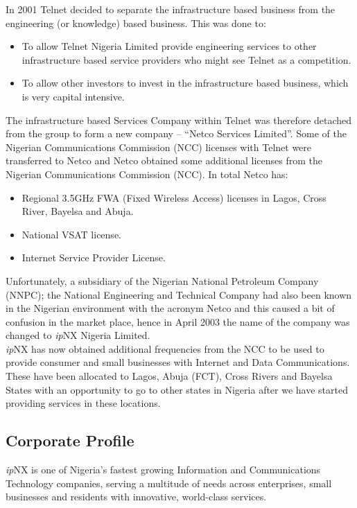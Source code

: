 In 2001 Telnet decided to separate the infrastructure based business from the engineering
(or knowledge) based business. This was done to:
\begin{itemize}
	\item To allow Telnet Nigeria Limited provide engineering services to other infrastructure
	based service providers who might see Telnet as a competition.
	\item To allow other investors to invest in the infrastructure based business, which is very
	capital intensive.
\end{itemize}

The infrastructure based Services Company within Telnet was therefore detached from the group to form a new company – “Netco Services Limited”. Some of the Nigerian Communications Commission (NCC) licenses with Telnet were transferred to Netco and
Netco obtained some additional licenses from the Nigerian Communications Commission (NCC). In total Netco has:

\begin{itemize}	
	\item Regional 3.5GHz FWA (Fixed Wireless Access) licenses in Lagos, Cross River, Bayelsa
	and Abuja.

	\item National VSAT license.
	\item Internet Service Provider License.
\end{itemize}

Unfortunately, a subsidiary of the Nigerian National Petroleum Company (NNPC); the National Engineering and Technical Company had also been known in the Nigerian environment with the acronym Netco and this caused a bit of confusion in the market
place, hence in April 2003 the name of the company was changed to \textit{ip}NX Nigeria Limited.\\

\textit{ip}NX has now obtained additional frequencies from the NCC to be used to provide consumer and small businesses with Internet and Data Communications. These have been allocated to Lagos, Abuja (FCT), Cross Rivers and Bayelsa States with an opportunity to go to other states in Nigeria after we have started providing services in these locations.
\subsection{Corporate Profile}
\textit{ip}NX is one of Nigeria’s fastest growing Information and Communications Technology companies, serving a multitude of needs across enterprises, small businesses and residents with innovative, world-class services.


